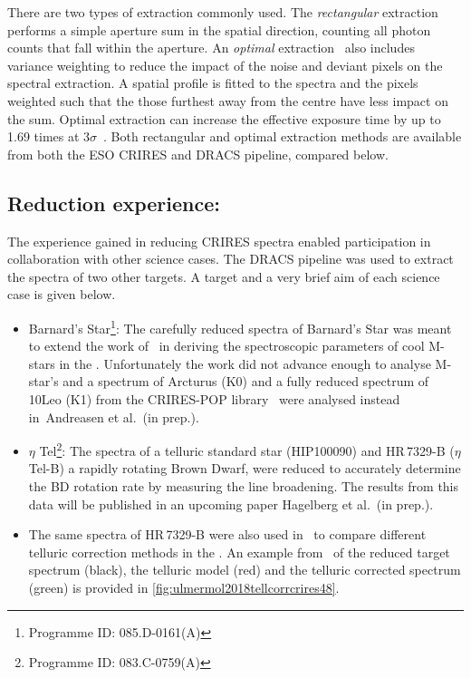 There are two types of extraction commonly used.
The \emph{rectangular} extraction performs a simple aperture sum in the spatial direction, counting all photon counts that fall within the aperture.
An \emph{optimal} extraction~\citep{horne_optimal_1986} also includes variance weighting to reduce the impact of the noise and deviant pixels on the spectral extraction.
A spatial profile is fitted to the spectra and the pixels weighted such that the those furthest away from the centre have less impact on the sum.
Optimal extraction can increase the effective exposure time by up to 1.69 times at \(3 \sigma\)~\citep{horne_optimal_1986}.
Both rectangular and optimal extraction methods are available from both the {ESO} {CRIRES} and {DRACS} pipeline, compared below.








\subsection{Reduction experience:}
\label{subsec:experience}
The experience gained in reducing {CRIRES} spectra enabled participation in collaboration with other science cases.
The {DRACS} pipeline was used to extract the spectra of two other targets.
A target and a very brief aim of each science case is given below.

\begin{itemize}
    \setlength\itemsep{-0.3em} %
    \item Barnard's Star\footnote{Programme {{ID}}: 085.D-0161(A)}: The carefully reduced \nir{} spectra of Barnard's Star was meant to extend the work of~\citet{andreasen_nearinfrared_2016} in deriving the spectroscopic parameters of cool M-stars in the \nir{}.
    Unfortunately the work did not advance enough to analyse M-star's and a spectrum of {Arcturus} (K0) and a fully reduced spectrum of {10Leo} (K1) from the {CRIRES}-POP library~\cite{nicholls_crirespop_2017} were analysed instead in~{Andreasen et al.\ (in prep.)}.
    \item \(\eta\) Tel\footnote{Programme {{ID}}: 083.C-0759(A)}: The spectra of a telluric standard star (HIP100090) and {HR\,7329-B} (\(\eta\) Tel-B) a rapidly rotating Brown Dwarf, were reduced to accurately determine the {BD} rotation rate by measuring the line broadening.
    The results from this data will be published in an upcoming paper {Hagelberg et al.\ (in prep.)}.
    \item The same spectra of {HR\,7329-B} were also used in~\citet{ulmer-moll_telluric_2018} to compare different telluric correction methods in the \nir{}.
    An example from~\citet[][(B.3)]{ulmer-moll_telluric_2018} of the reduced target spectrum (black), the telluric model (red) and the telluric corrected spectrum (green) is provided in \cref{fig:ulmermol2018tellcorrcrires48}.
\end{itemize}

